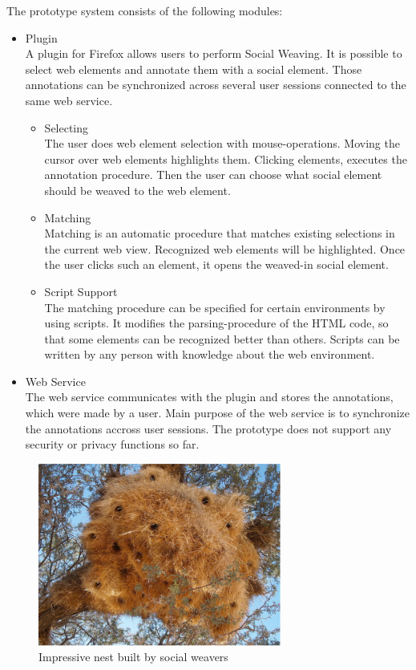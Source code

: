 The prototype system consists of the following modules:
\begin{itemize}
	\item Plugin\\
	A plugin for Firefox allows users to perform Social Weaving. It is possible to select web elements and annotate them with a social element. Those annotations can be synchronized across several user sessions connected to the same web service. 
	\begin{itemize}
		\item Selecting \\  
		The user does web element selection with mouse-operations. Moving the cursor over web elements highlights them. Clicking elements, executes the annotation procedure. Then the user can choose what social element should be weaved to the web element.
		\item Matching \\ 
		Matching is an automatic procedure that matches existing selections in the current web view. Recognized web elements will be highlighted. Once the user clicks such an element, it opens the weaved-in social element.
		\item Script Support \\ 
		The matching procedure can be specified for certain environments by using scripts. It modifies the parsing-procedure of the HTML code, so that some elements can be recognized better than others.  Scripts can be written by any person with knowledge about the web environment.
	\end{itemize}
	
	\item Web Service\\
		The web service communicates with the plugin and stores the annotations, which were made by a user. Main purpose of the web service is to synchronize the annotations accross user sessions. The prototype does not support any security or privacy functions so far. 
\end{itemize}


\begin{figure}\centering
		\includegraphics[width=8cm]{images/sowe-nest.png}
		\caption{Impressive nest built by social weavers}
		\label{sowe-nest}
\end{figure} 

